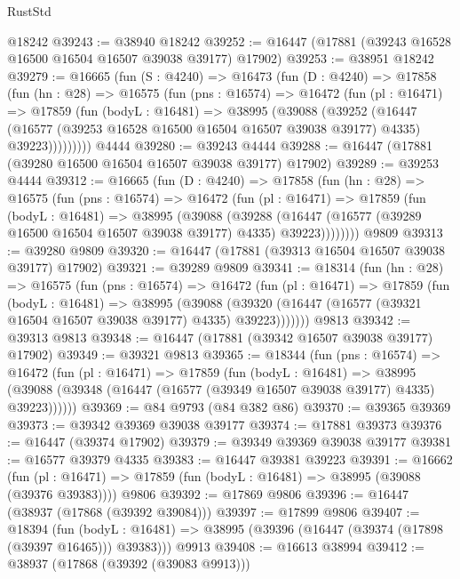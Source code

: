 \begin{lexlean}{RustStd}
\begin{coremodule}
{\begin{coremodule}
{{{{{{{{{{{{{{{{{{{{{{{{{{{{{{{{{{{{{{{{{{{{{{{{{{{{{{{    @18242
@39243 := @38940 @18242
@39252 := @16447 (@17881 (@39243 @16528 @16500 @16504 @16507 @39038 @39177) @17902)
@39253 := @38951 @18242
@39279 := @16665
    (fun (S : @4240) =>
    @16473
      (fun (D : @4240) =>
      @17858
        (fun (hn : @28) =>
        @16575
          (fun (pns : @16574) =>
          @16472
            (fun (pl : @16471) =>
            @17859
              (fun (bodyL : @16481) =>
              @38995
                (@39088
                  (@39252
                    (@16447
                      (@16577 (@39253 @16528 @16500 @16504 @16507 @39038 @39177) @4335)
                      @39223)))))))))
    @4444
@39280 := @39243 @4444
@39288 := @16447 (@17881 (@39280 @16500 @16504 @16507 @39038 @39177) @17902)
@39289 := @39253 @4444
@39312 := @16665
    (fun (D : @4240) =>
    @17858
      (fun (hn : @28) =>
      @16575
        (fun (pns : @16574) =>
        @16472
          (fun (pl : @16471) =>
          @17859
            (fun (bodyL : @16481) =>
            @38995
              (@39088
                (@39288
                  (@16447 (@16577 (@39289 @16500 @16504 @16507 @39038 @39177) @4335) @39223))))))))
    @9809
@39313 := @39280 @9809
@39320 := @16447 (@17881 (@39313 @16504 @16507 @39038 @39177) @17902)
@39321 := @39289 @9809
@39341 := @18314
    (fun (hn : @28) =>
    @16575
      (fun (pns : @16574) =>
      @16472
        (fun (pl : @16471) =>
        @17859
          (fun (bodyL : @16481) =>
          @38995
            (@39088
              (@39320 (@16447 (@16577 (@39321 @16504 @16507 @39038 @39177) @4335) @39223)))))))
    @9813
@39342 := @39313 @9813
@39348 := @16447 (@17881 (@39342 @16507 @39038 @39177) @17902)
@39349 := @39321 @9813
@39365 := @18344
    (fun (pns : @16574) =>
    @16472
      (fun (pl : @16471) =>
      @17859
        (fun (bodyL : @16481) =>
        @38995 (@39088 (@39348 (@16447 (@16577 (@39349 @16507 @39038 @39177) @4335) @39223))))))
@39369 := @84 @9793 (@84 @382 @86)
@39370 := @39365 @39369
@39373 := @39342 @39369 @39038 @39177
@39374 := @17881 @39373
@39376 := @16447 (@39374 @17902)
@39379 := @39349 @39369 @39038 @39177
@39381 := @16577 @39379 @4335
@39383 := @16447 @39381 @39223
@39391 := @16662
    (fun (pl : @16471) => @17859 (fun (bodyL : @16481) => @38995 (@39088 (@39376 @39383))))
    @9806
@39392 := @17869 @9806
@39396 := @16447 (@38937 (@17868 (@39392 @39084)))
@39397 := @17899 @9806
@39407 := @18394
    (fun (bodyL : @16481) => @38995 (@39396 (@16447 (@39374 (@17898 (@39397 @16465))) @39383)))
    @9913
@39408 := @16613 @38994
@39412 := @38937 (@17868 (@39392 (@39083 @9913)))
}}}}}}}}}}}}}}}}}}}}}}}}}}}}}}}}}}}}}}}}}}}}}}}}}}}}}}}
\end{coremodule}}
\end{coremodule}
\end{lexlean}
